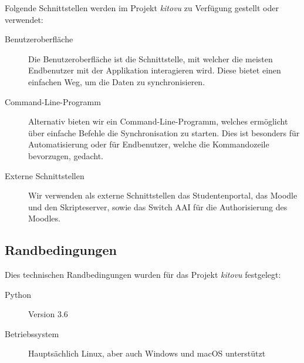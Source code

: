 \documentclass[a4paper]{article}
\begin{document}
Folgende Schnittstellen werden im Projekt \emph{kitovu} zu Verfügung gestellt oder verwendet:

\begin{description}
  \item[Benutzeroberfläche]
    Die Benutzeroberfläche ist die Schnittstelle, mit welcher die meisten Endbenutzer mit der Applikation interagieren wird.
    Diese bietet einen einfachen Weg, um die Daten zu synchronisieren.
  \item[Command-Line-Programm]
    Alternativ bieten wir ein Command-Line-Programm, welches ermöglicht über einfache Befehle die Synchronisation zu starten.
    Dies ist besonders für Automatisierung oder für Endbenutzer, welche die Kommandozeile bevorzugen, gedacht.
  \item[Externe Schnittstellen]
    Wir verwenden als externe Schnittstellen das Studentenportal, das Moodle und den Skripteserver, sowie das Switch AAI für die Authorisierung des Moodles.
\end{description}

\subsection{Randbedingungen}

Dies technischen Randbedingungen wurden für das Projekt \emph{kitovu} festgelegt:

\begin{description}
  \item[Python] Version 3.6
  \item[Betriebssystem] Hauptsächlich Linux, aber auch Windows und macOS unterstützt
\end{description}
\end{document}
